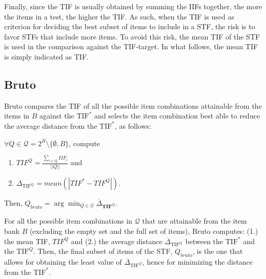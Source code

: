 \documentclass[12pt, a4paper, titilepage]{article}
\begin{document}
 Finally, since the TIF is usually obtained by summing the IIFs together, the more the items in a test, the higher the TIF. 
 As such, when the TIF is used as criterion for deciding the best subset of items to include in a STF, the risk is to favor STFs that include more items. 
 To avoid this risk, the mean TIF of the STF is used in the comparison against the TIF-target. In what follows, the mean  TIF is simply indicated as TIF. 

 
 

\subsection*{Bruto}


Bruto compares the TIF of all the possible item combinations attainable from the items in $B$ against the $\text{TIF}^*$ and selects the item combination best able to reduce the average distance from the $\text{TIF}^*$, as follows:  

%	
%	
%	

$\forall Q \in\mathcal{Q} = 2^B \setminus \{\emptyset, B\}$, compute

\begin{enumerate}
	\item $TIF^{Q} =  \frac{\sum_{i \in Q} IIF_i}{||Q||}$ and
	\item $\overline{\Delta}_{\text{TIF}^{Q}} =  \mathit{mean}(|TIF^* - TIF^{Q}|)$. 
\end{enumerate}


Then, $Q_{bruto} = \arg \min_{Q \in \mathcal{Q}} \overline{\Delta}_{\mathbf{TIF}^{Q}}$.

For all the possible item combinations in $\mathcal{Q}$ that are attainable from the item bank $B$ (excluding the empty set and the full set of items), Bruto computes: (1.) the mean TIF, $TIF^Q$ and (2.) 
the average distance $\overline{\Delta}_{\text{TIF}^Q}$ between the $\text{TIF}^*$ and the $\text{TIF}^Q$.  Then, the final subset of items of the STF, $Q_{bruto}$, is the one that allows for obtaining the least value of $\overline{\Delta}_{\text{TIF}^{Q}}$, hence for minimizing the distance from the $\text{TIF}^*$.
\end{document}
